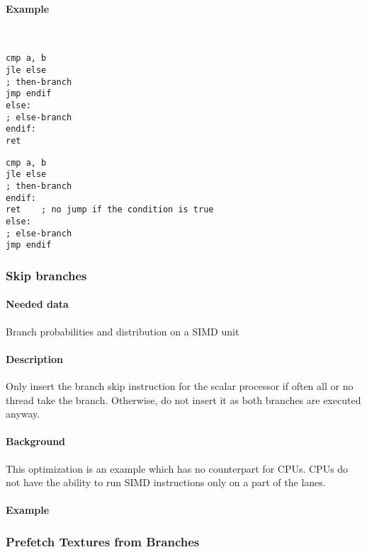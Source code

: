 \paragraph{Example}\ \\%
\begin{minipage}{.47\textwidth}
\begin{lstlisting}[caption={Linearization -- unoptimized},frame=tlrb,language={[x86masm]Assembler}]
cmp a, b
jle else
; then-branch
jmp endif
else:
; else-branch
endif:
ret
\end{lstlisting}
\end{minipage}\hfill
\begin{minipage}{.47\textwidth}
\begin{lstlisting}[caption={Linearization -- optimized},frame=tlrb,language={[x86masm]Assembler}]
cmp a, b
jle else
; then-branch
endif:
ret    ; no jump if the condition is true
else:
; else-branch
jmp endif
\end{lstlisting}
\end{minipage}

\subsubsection{Skip branches}
\paragraph{Needed data} Branch probabilities and distribution on a SIMD unit
\paragraph{Description} Only insert the branch skip instruction for the scalar processor if often all or no thread take the branch. Otherwise, do not insert it as both branches are executed anyway.
\paragraph{Background} This optimization is an example which has no counterpart for CPUs. CPUs do not have the ability to run SIMD instructions only on a part of the lanes.
\paragraph{Example}
	
\subsubsection{Prefetch Textures from Branches}
